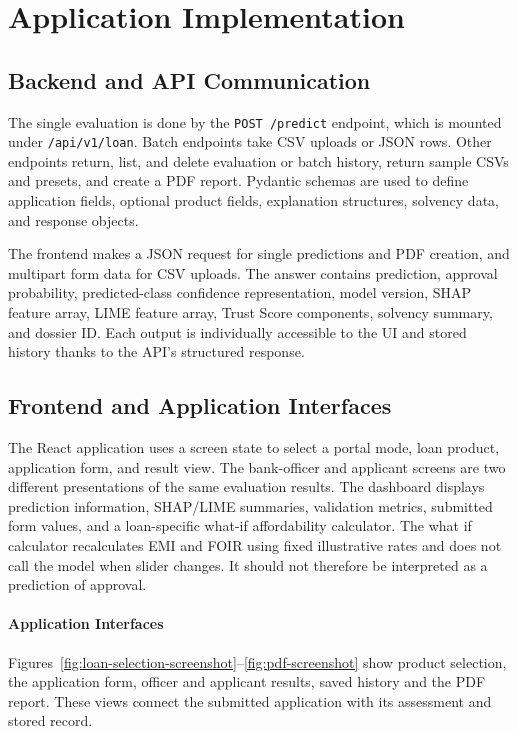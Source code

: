 \section{Application Implementation}
\subsection{Backend and API Communication}
The single evaluation is done by the \texttt{POST /predict} endpoint, which is mounted under \texttt{/api/v1/loan}. Batch endpoints take CSV uploads or JSON rows. Other endpoints return, list, and delete evaluation or batch history, return sample CSVs and presets, and create a PDF report. Pydantic schemas are used to define application fields, optional product fields, explanation structures, solvency data, and response objects.

The frontend makes a JSON request for single predictions and PDF creation, and multipart form data for CSV uploads. The answer contains prediction, approval probability, predicted-class confidence representation, model version, SHAP feature array, LIME feature array, Trust Score components, solvency summary, and dossier ID. Each output is individually accessible to the UI and stored history thanks to the API's structured response.

\subsection{Frontend and Application Interfaces}
The React application uses a screen state to select a portal mode, loan product, application form, and result view. The bank-officer and applicant screens are two different presentations of the same evaluation results. The dashboard displays prediction information, SHAP/LIME summaries, validation metrics, submitted form values, and a loan-specific what-if affordability calculator. The what if calculator recalculates EMI and FOIR using fixed illustrative rates and does not call the model when slider changes. It should not therefore be interpreted as a prediction of approval.

\paragraph*{Application Interfaces}
Figures~\ref{fig:loan-selection-screenshot}--\ref{fig:pdf-screenshot} show product selection, the application form, officer and applicant results, saved history and the PDF report. These views connect the submitted application with its assessment and stored record.

